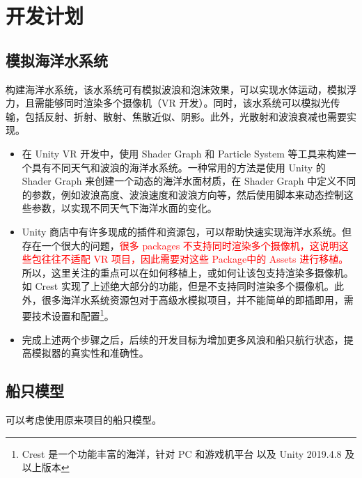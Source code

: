 \documentclass[letterpaper,10pt]{article}
\begin{document}
		\section{开发计划}
	
			\subsection{模拟海洋水系统}
	
			构建海洋水系统，该水系统可有模拟波浪和泡沫效果，可以实现水体运动，模拟浮力，且需能够同时渲染多个摄像机（VR 开发）。同时，该水系统可以模拟光传输，包括反射、折射、散射、焦散近似、阴影。此外，光散射和波浪衰减也需要实现。
		
			\begin{itemize}
				\item [(1)] 
				在 Unity VR 开发中，使用 Shader Graph 和 Particle System 等工具来构建一个具有不同天气和波浪的海洋水系统。一种常用的方法是使用 Unity 的 Shader Graph 来创建一个动态的海洋水面材质，在 Shader Graph 中定义不同的参数，例如波浪高度、波浪速度和波浪方向等，然后使用脚本来动态控制这些参数，以实现不同天气下海洋水面的变化。
			
				\item [(2)]
				Unity 商店中有许多现成的插件和资源包，可以帮助快速实现海洋水系统。但存在一个很大的问题，\textcolor{red}{很多 packages 不支持同时渲染多个摄像机，这说明这些包往往不适配 VR 项目，因此需要对这些 Package中的 Assets 进行移植。} 所以，这里关注的重点可以在如何移植上，或如何让该包支持渲染多摄像机。如 Crest 实现了上述绝大部分的功能，但是不支持同时渲染多个摄像机。此外，很多海洋水系统资源包对于高级水模拟项目，并不能简单的即插即用，需要技术设置和配置\footnote{Crest 是一个功能丰富的海洋，针对 PC 和游戏机平台 以及 Unity 2019.4.8 及以上版本}。
				
				\item [(3)]
				完成上述两个步骤之后，后续的开发目标为增加更多风浪和船只航行状态，提高模拟器的真实性和准确性。
			\end{itemize}
	
			\subsection{船只模型}
		
			可以考虑使用原来项目的船只模型。
	
	

	
\end{document}
